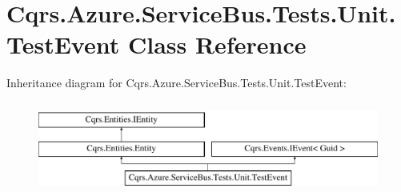 \hypertarget{classCqrs_1_1Azure_1_1ServiceBus_1_1Tests_1_1Unit_1_1TestEvent}{}\section{Cqrs.\+Azure.\+Service\+Bus.\+Tests.\+Unit.\+Test\+Event Class Reference}
\label{classCqrs_1_1Azure_1_1ServiceBus_1_1Tests_1_1Unit_1_1TestEvent}
Inheritance diagram for Cqrs.\+Azure.\+Service\+Bus.\+Tests.\+Unit.\+Test\+Event\+:\begin{figure}[H]
\begin{center}
\leavevmode
\includegraphics[height=3.000000cm]{classCqrs_1_1Azure_1_1ServiceBus_1_1Tests_1_1Unit_1_1TestEvent}
\end{center}
\end{figure}
